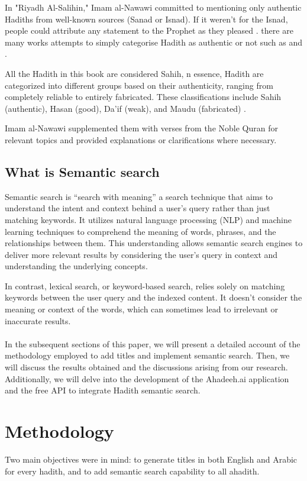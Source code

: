 In "Riyadh Al-Salihin," Imam al-Nawawi committed to mentioning only authentic Hadiths from well-known sources (Sanad or Isnad). If it weren't for the Isnad, people could attribute any statement to the Prophet as they pleased \cite{hasan1994introduction}. there are many works attempts to simply categorise Hadith as authentic or
not such as \cite{bilal2012muhadith} and \cite{hakak2022digital}. 

All the Hadith in this book are considered Sahih, n essence, Hadith are categorized into different groups based on their authenticity, ranging from completely reliable to entirely fabricated. These classifications include Sahih (authentic), Hasan (good), Da'if (weak), and Maudu (fabricated) \cite{aldhaln2012improving}.



Imam al-Nawawi supplemented them with verses from the Noble Quran for relevant topics and provided explanations or clarifications where necessary. \cite{site_Tawseef_book}

\subsection{What is Semantic search}
Semantic search is “search with meaning” \cite{bast2016semantic} a search technique that aims to understand the intent and context behind a user's query rather than just matching keywords. It utilizes natural language processing (NLP) and machine learning techniques to comprehend the meaning of words, phrases, and the relationships between them. This understanding allows semantic search engines to deliver more relevant results by considering the user's query in context and understanding the underlying concepts.

In contrast, lexical search, or keyword-based search, relies solely on matching keywords between the user query and the indexed content. It doesn't consider the meaning or context of the words, which can sometimes lead to irrelevant or inaccurate results.
\\
\\
In the subsequent sections of this paper, we will present a detailed account of the methodology employed to add titles and implement semantic search. Then, we will discuss the results obtained and the discussions arising from our research. Additionally, we will delve into the development of the Ahadeeh.ai application and the free API to integrate Hadith semantic search.

\section{Methodology}
Two main objectives were in mind: to generate titles in both English and Arabic for every hadith, and to add semantic search capability to all ahadith.

